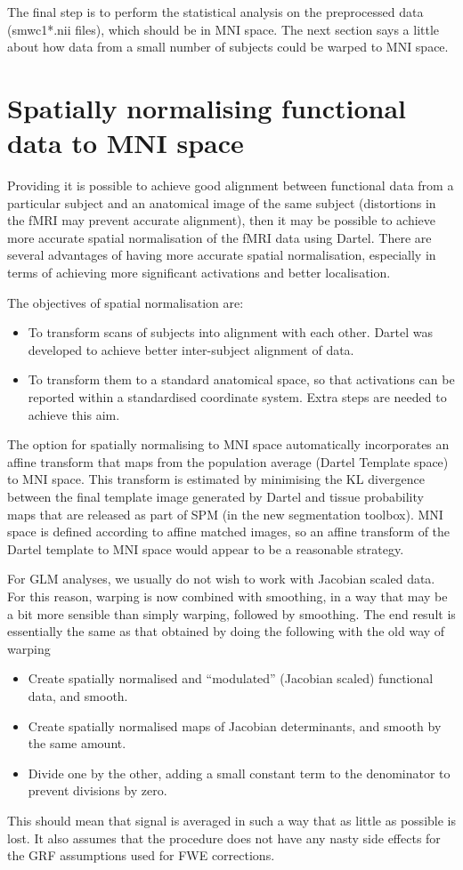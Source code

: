 The final step is to perform the statistical analysis on the preprocessed data (smwc1*.nii files), which should be in MNI space.
The next section says a little about how data from a small number of subjects could be warped to MNI space.



\section{Spatially normalising functional data to MNI space}
Providing it is possible to achieve good alignment between functional data from a particular subject and an anatomical image of the same subject (distortions in the fMRI may prevent accurate alignment), then it may be possible to achieve more accurate spatial normalisation of the fMRI data using Dartel.
There are several advantages of having more accurate spatial normalisation, especially in terms of achieving more significant activations and better localisation.

The objectives of spatial normalisation are:
\begin{itemize}
\item{To transform scans of subjects into alignment with each other.
Dartel was developed to achieve better inter-subject alignment of data.
}
\item{To transform them to a standard anatomical space, so that activations can be reported within a standardised coordinate system.
Extra steps are needed to achieve this aim.
}
\end{itemize}

The option for spatially normalising to MNI space automatically incorporates an affine transform that maps from the population average (Dartel Template space) to MNI space.
This transform is estimated by minimising the KL divergence between the final template image generated by Dartel and tissue probability maps that are released as part of SPM (in the new segmentation toolbox).  MNI space is defined according to affine matched images, so an affine transform of the Dartel template to MNI space would appear to be a reasonable strategy.

For GLM analyses, we usually do not wish to work with Jacobian scaled data.
For this reason, warping is now combined with smoothing, in a way that may be a bit more
sensible than simply warping, followed by smoothing.  The end result is
essentially the same as that obtained by doing the following with the old way of warping
\begin{itemize}
\item{Create spatially normalised and ``modulated'' (Jacobian scaled) functional data, and smooth.}
\item{Create spatially normalised maps of Jacobian determinants, and smooth by the same amount.}
\item{Divide one by the other, adding a small constant term to the denominator to prevent divisions by zero.}
\end{itemize}
This should mean that signal is averaged in such a way that as little as possible
is lost.  It also assumes that the procedure does not have any nasty side
effects for the GRF assumptions used for FWE corrections.

